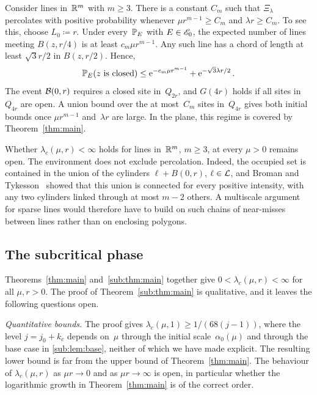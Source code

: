 \documentclass[11pt,letterpaper]{article}
\begin{document}
\begin{remark}
\label{rem:dense-lines}
Consider lines in~$\R^m$ with $m\ge3$. There is a constant $C_m$ such that $\Xi_\lambda$ percolates with positive probability whenever $\mu r^{m-1}\ge C_m$ and $\lambda r\ge C_m$. To see this, choose $L_0\coloneqq r$. Under every~$\P_E$ with $E\in\cE_0$, the expected number of lines meeting $B(z,r/4)$ is at least $c_m\mu r^{m-1}$. Any such line has a chord of length at least $\sqrt3r/2$ in $B(z,r/2)$. Hence,
\begin{equation*}
  \P_E(z\text{ is closed})\le\e^{-c_m\mu r^{m-1}}+\e^{-\sqrt3\lambda r/2}\,.
\end{equation*}
The event $\cB(0,r)$ requires a closed site in~$Q_{2r}$, and $G(4r)$ holds if all sites in $Q_{4r}$ are open. A union bound over the at most~$C_m$ sites in~$Q_{4r}$ gives both initial bounds once $\mu r^{m-1}$ and~$\lambda r$ are large. In the plane, this regime is covered by Theorem~\ref{thm:main}.
\end{remark}

Whether $\lambda_c(\mu,r)<\infty$ holds for lines in~$\R^m$, $m\ge3$, at every $\mu>0$ remains open. The environment does not exclude percolation. Indeed, the occupied set is contained in the union of the cylinders $\ell+B(0,r)$, $\ell\in\cL$, and Broman and Tykesson~\cite{BT16} showed that this union is connected for every positive intensity, with any two cylinders linked through at most $m-2$ others. A multiscale argument for sparse lines would therefore have to build on such chains of near-misses between lines rather than on enclosing polygons.

\subsection{The subcritical phase}
\label{sec:subcritical-outlook}

Theorems~\ref{thm:main} and~\ref{sub:thm:main} together give $0<\lambda_c(\mu,r)<\infty$ for all $\mu,r>0$. The proof of Theorem~\ref{sub:thm:main} is qualitative, and it leaves the following questions open.

\emph{Quantitative bounds.} The proof gives $\lambda_c(\mu,1)\ge1/(68(j-1))$, where the level $j=j_0+k_c$ depends on~$\mu$ through the initial scale~$\alpha_0(\mu)$ and through the base case in \cref{sub:lem:base}, neither of which we have made explicit. The resulting lower bound is far from the upper bound of Theorem~\ref{thm:main}. The behaviour of $\lambda_c(\mu,r)$ as $\mu r\to0$ and as $\mu r\to\infty$ is open, in particular whether the logarithmic growth in Theorem~\ref{thm:main} is of the correct order.
\end{document}
